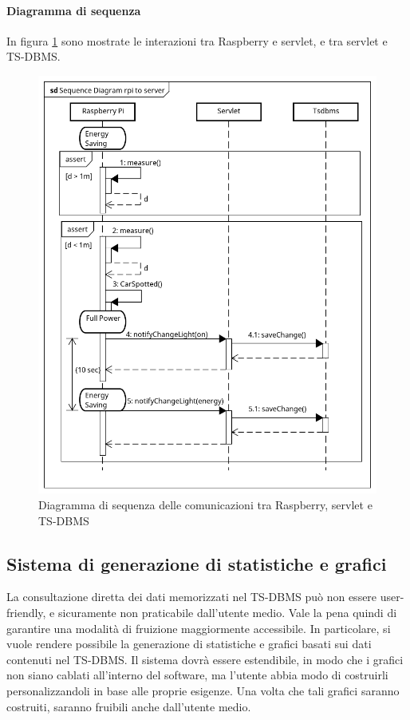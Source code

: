 \paragraph{Diagramma di sequenza}
In figura \ref{SEQ RPI TO SERVER} sono mostrate le interazioni tra Raspberry e servlet, e tra servlet e TS-DBMS.
\begin{figure}[tbp]
	\centering
	\includegraphics[scale=.65]{figure/Sequence_Diagram_rpi_to_server.png}
	\caption{Diagramma di sequenza delle comunicazioni tra Raspberry, servlet e TS-DBMS \label{SEQ RPI TO SERVER}}
\end{figure}

\newpage
\subsection{Sistema di generazione di statistiche e grafici}
La consultazione diretta dei dati memorizzati nel TS-DBMS può non essere user-friendly, e sicuramente non praticabile dall'utente medio.
Vale la pena quindi di garantire una modalità di fruizione maggiormente accessibile.
In particolare, si vuole rendere possibile la generazione di statistiche e grafici basati sui dati contenuti nel TS-DBMS.
Il sistema dovrà essere estendibile, in modo che i grafici non siano cablati all'interno del software, ma l'utente abbia modo di costruirli personalizzandoli in base alle proprie esigenze.
Una volta che tali grafici saranno costruiti, saranno fruibili anche dall'utente medio.

